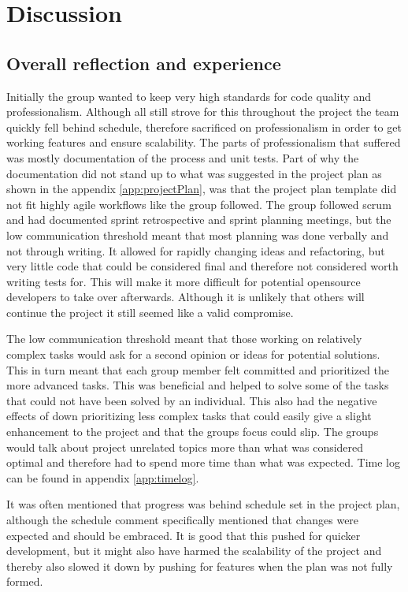 \chapter{Discussion}
\label{chap:discussion}

\section{Overall reflection and experience}

Initially the group wanted to keep very high standards for code quality and professionalism. Although all still strove for this throughout the project the team quickly fell behind schedule, therefore sacrificed on professionalism in order to get working features and ensure scalability. The parts of professionalism that suffered was mostly documentation of the process and unit tests. Part of why the documentation did not stand up to what was suggested in the project plan as shown in the appendix \ref{app:projectPlan}, was that the project plan template did not fit highly \gls{agile} workflows like the group followed. The group followed \gls{scrum} and had documented sprint retrospective and sprint planning meetings, but the low communication threshold meant that most planning was done verbally and not through writing. It allowed for rapidly changing ideas and refactoring, but very little code that could be considered final and therefore not considered worth writing tests for. This will make it more difficult for potential \gls{opensource} developers to take over afterwards. Although it is unlikely that others will continue the project it still seemed like a valid compromise.

The low communication threshold meant that those working on relatively complex tasks would ask for a second opinion or ideas for potential solutions. This in turn meant that each group member felt committed and prioritized the more advanced tasks. This was beneficial and helped to solve some of the tasks that could not have been solved by an individual. This also had the negative effects of down prioritizing less complex tasks that could easily give a slight enhancement to the project and that the groups focus could slip. The groups would talk about project unrelated topics more than what was considered optimal and therefore had to spend more time than what was expected. Time log can be found in appendix \ref{app:timelog}.

It was often mentioned that progress was behind schedule set in the project plan, although the schedule comment specifically mentioned that changes were expected and should be embraced. It is good that this pushed for quicker development, but it might also have harmed the scalability of the project and thereby also slowed it down by pushing for features when the plan was not fully formed. 

